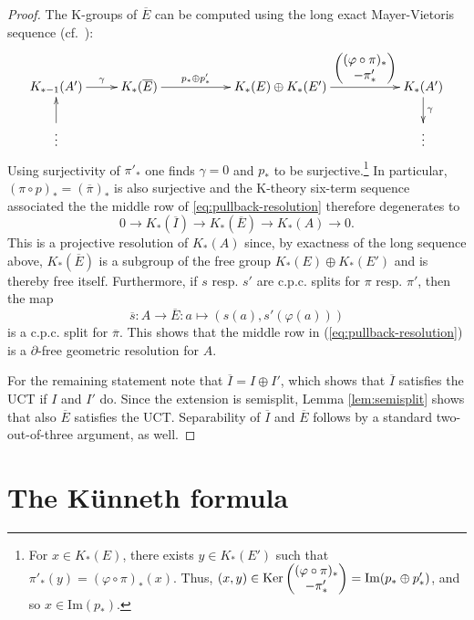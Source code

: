\documentclass[a4paper,10pt]{amsart}
\newcommand{\T}[1]{\textup{#1}}
\numberwithin{equation}{section}
\numberwithin{theorem}{section}
\begin{document}
\begin{proof}
The K-groups of $\overline{E}$ can be computed using the long exact Mayer-Vietoris sequence (cf.~\cite[Theorem 21.2.2]{Blackadar:KBook}):
\[
	\xymatrix{
	 K_{*-1}(A') \ar[r]^-\gamma & K_*(\overline{E}) \ar[rr]^-{p_*\oplus p'_*} & &  K_*(E)\oplus K_*(E') \ar[rr]^-{\begin{pmatrix}   (\varphi\circ\pi)_* \\  -\pi'_* \end{pmatrix} } & &  K_*(A') \ar[d]^-\gamma \\
	 \vdots \ar[u] &  & &  & & \vdots
	}
\]
Using surjectivity of $\pi'_*$ one finds $\gamma=0$ and $p_*$ to be surjective.\footnote{For $x \in K_*(E)$, there exists $y \in K_*(E')$ such that $\pi'_*(y)=(\varphi\circ\pi)_*(x)$. Thus, $(x,y) \in \T{Ker} \begin{pmatrix}   (\varphi\circ\pi)_* \\  -\pi'_* \end{pmatrix} =\mathrm{Im}(p_*\oplus p'_*)$, and so $x \in \mathrm{Im}(p_*)$.} In particular, $(\pi\circ p)_* = (\overline \pi)_*$ is also surjective and the K-theory six-term sequence associated the the middle row of \eqref{eq:pullback-resolution} therefore degenerates to
\[
	0\to K_*(\overline{I}) \to K_*(\overline{E}) \to K_*(A) \to 0.
\]
This is a projective resolution of $K_*(A)$ since, by exactness of the long sequence above, $K_*(\overline{E})$ is a subgroup of the free group $K_*(E)\oplus K_*(E')$ and is thereby free itself. Furthermore, if $s$ resp. $s'$ are c.p.c. splits for $\pi$ resp. $\pi'$, then the map 
$$
	\overline s \colon A \to \overline E : a \mapsto (s(a),s'(\varphi(a))) 
$$
is a c.p.c. split for $\overline \pi$. This shows that the middle row in (\ref{eq:pullback-resolution}) is a $\partial$-free geometric resolution for $A$.
\par For the remaining statement note that $\overline I = I \oplus I'$, which shows that $\overline I$ satisfies the UCT if $I$ and $I'$ do. Since the extension is semisplit, Lemma \ref{lem:semisplit} shows that also $\overline E$ satisfies the UCT. Separability of $\overline I$ and $\overline E$ follows by a standard two-out-of-three argument, as well.
\end{proof}




\section{The K\"unneth formula}
\label{sec:KT}
\end{document}
